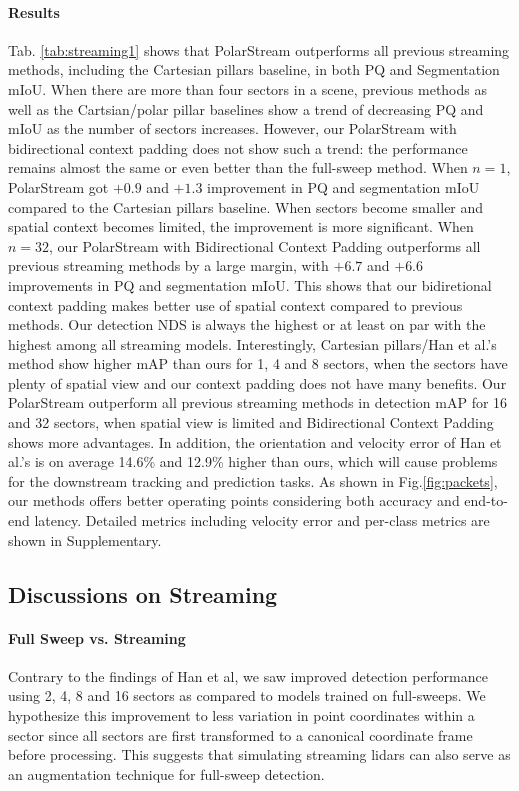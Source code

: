 \documentclass{article}
\begin{document}
\paragraph{Results} Tab. \ref{tab:streaming1} shows that PolarStream outperforms all previous streaming methods, including the Cartesian pillars baseline, in both PQ and Segmentation mIoU. When there are more than four sectors in a scene, previous methods as well as the Cartsian/polar pillar baselines show a trend of decreasing PQ and mIoU as the number of sectors increases. However, our PolarStream with bidirectional context padding does not show such a trend: the performance remains almost the same or even better than the full-sweep method. When $n=1$, PolarStream got $+0.9$ and $+1.3$ improvement in PQ and segmentation mIoU compared to the Cartesian pillars baseline. When sectors become smaller and spatial context becomes limited, the improvement is more significant. When $n=32$, our PolarStream with Bidirectional Context Padding outperforms all previous streaming methods by a large margin, with $+6.7$ and $+6.6$ improvements in PQ and segmentation mIoU. This shows that our bidiretional context padding makes better use of spatial context compared to previous methods. Our detection NDS is always the highest or at least on par with the highest among all streaming models. Interestingly, Cartesian pillars/Han et al.'s method show higher mAP than ours for 1, 4 and 8 sectors, when the sectors have plenty of spatial view and our context padding does not have many benefits. Our PolarStream outperform all previous streaming methods in detection mAP for 16 and 32 sectors, when spatial view is limited and Bidirectional Context Padding shows more advantages. In addition, the orientation and velocity error of Han et al.'s is on average 14.6\% and 12.9\% higher than ours, which will cause problems for the downstream tracking and prediction tasks. As shown in Fig.\ref{fig:packets}, our methods offers better operating points considering both accuracy and end-to-end latency. Detailed metrics including velocity error and per-class metrics are shown in Supplementary.



\subsection{Discussions on Streaming}
\paragraph{Full Sweep vs. Streaming}
Contrary to the findings of Han et al\cite{han2020streaming}, we saw improved detection performance using 2, 4, 8 and 16 sectors as compared to models trained on full-sweeps. We hypothesize this improvement to less variation in point coordinates within a sector since all sectors are first transformed to a canonical coordinate frame before processing. This suggests that simulating streaming lidars can also serve as an augmentation technique for full-sweep detection.
\end{document}
